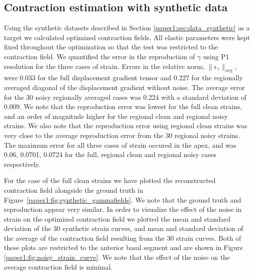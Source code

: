 \subsection{Contraction estimation with synthetic data}
\label{paper1:sec:results_synthetic}
Using the synthetic datasets described in Section \ref{paper1:sec:data_synthetic} as a target we 
calculated optimized contraction fields. All elastic parameters 
were kept fixed throughout the optimization so that the test was restricted to
the contraction field.
We quantified the error in the reproduction of $\gamma$ using P1
resolution for the three cases of strain. Errors in the relative norm, $\| \epsilon_{\gamma} \|_{\text{avg}}$,
were 0.033 for the full displacement gradient tensor and 0.227 for the 
regionally averaged diagonal of the displacement gradient without noise. The average error
for the 30 noisy regionally averaged cases was 0.224 with a standard deviation of 0.009.
We note that the reproduction error was lowest for the full clean strains, 
and an order of magnitude higher
for the regional clean and regional noisy strains. We also note that the 
reproduction error using regional clean strains was very
close to the average reproduction error from the 30 regional noisy strains.
The maximum error for all three cases of strain occured in the apex, 
and was 0.06, 0.0701, 0.0724 for the full, regional clean and regional noisy cases
respectively.



For the case of the full clean strains we have plotted the 
reconstructed contraction field alongside the ground truth in
Figure~\ref{paper1:fig:synthetic_gammafields}. 
We note that the ground truth and reproduction appear very similar. In
order to visualize the effect of the  
noise in strain on the optimized contraction field we
plotted the mean and standard deviation of the 30 synthetic strain curves,
and mean and standard deviation of the average of the contraction field 
resulting from the 30 strain curves. Both of these plots are
restricted to the anterior basal segment and are shown in Figure
\ref{paper1:fig:noisy_strain_curve}. We note that the effect of the noise on
the average contraction field is minimal.


